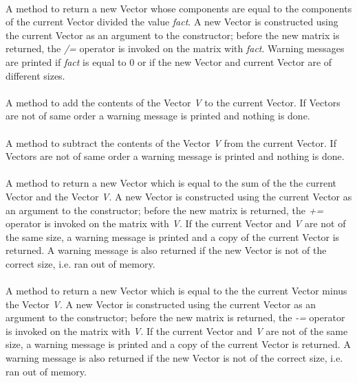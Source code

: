  \\
A method to return a new Vector whose components are equal to the
components of the current Vector divided the value {\em fact}. A new
Vector is constructed using the current Vector as an argument to the
constructor; before the new matrix is returned, the {\em /=} operator
is invoked on the matrix with {\em fact}. Warning messages are printed
if {\em fact} is equal to $0$ or if the new Vector and current Vector
are of different sizes. \\ 

 \\
A method to add the contents of the Vector {\em V} to the current
Vector. If Vectors are not of same order a warning message is printed
and nothing is done.  \\ 

 \\
A method to subtract the contents of the Vector {\em V} from the
current Vector. If Vectors are not of same order a warning message is
printed and nothing is done.  \\ 


 \\
A method to return a new Vector which is equal to the sum of the
the current Vector and the Vector {\em V}. A new Vector is constructed
using the current Vector as an argument to the constructor; before the
new matrix is returned, the {\em +=} operator is invoked on the matrix
with {\em V}. If the current Vector and {\em V} are not of the same size,
a warning message is printed and a copy of the current Vector is
returned. A warning message is also returned if the new Vector is not
of the correct size, i.e. ran out of memory. \\ 


 \\
A method to return a new Vector which is equal to the the current
Vector minus the Vector {\em V}. A new Vector is constructed using the
current Vector as an argument to the constructor; before the new
matrix is returned, the {\em -=} operator is invoked on the matrix
with {\em V}. If the current Vector and {\em V} are not of the same size,
a warning message is printed and a copy of the current Vector is
returned. A warning message is also returned if the new Vector is not
of the correct size, i.e. ran out of memory. \\ 


